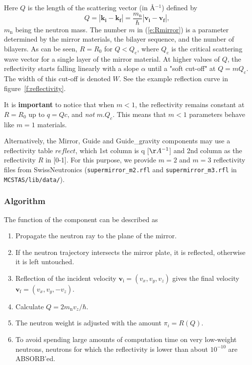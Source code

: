 Here $Q$ is the length of the scattering vector (in \AA$^{-1}$)
defined by
\begin{equation} \label{e:reflectivity}
Q = |\textbf{k}_\textbf{i} - \textbf{k}_\textbf{f}|
  = \frac{m_\textrm{n}}{\hbar} |\textbf{v}_\textbf{i} - \textbf{v}_\textbf{f}|,
\end{equation}
$m_\textrm{n}$ being the neutron mass.
The number $m$ in (\ref{e:Rmirror}) is a parameter determined by
the mirror materials,
the bilayer sequence, and the number of bilayers.
As can be seen, $R=R_0$ for $Q < Q_\textrm{c}$, where $Q_\textrm{c}$ is the
critical scattering wave vector for a single layer of the mirror
material. At higher values of $Q$, the reflectivity starts falling
linearly with a slope $\alpha$ until a "soft cut-off" at $Q = m Q_\textrm{c}$.
The width of this cut-off is denoted $W$. See the example reflection curve in
figure~\ref{f:reflectivity}.

It is \textbf{important} to notice that when $m < 1$, the reflectivity remains constant at $R=R_0$ up to $q=Qc$, and \emph{not} $m.Q_c$. This means that $m < 1$ parameters behave like $m=1$ materials.

Alternatively, the Mirror, Guide and Guide\_gravity components may use a reflectivity table $reflect$, which 1st column is q [$\AA^{-1}$] and 2nd column as the reflectivity $R$ in [0-1]. For this purpose, we provide $m=2$ and $m=3$ reflectivity files from SwissNeutronics (\verb+supermirror_m2.rfl+ and \verb+supermirror_m3.rfl+ in \verb+MCSTAS/lib/data/+).

\subsubsection{Algorithm}
The function of the component can be described as
\begin{enumerate}
\item Propagate the neutron ray to the plane of the mirror.
\item If the neutron trajectory intersects the mirror plate, it is
reflected, otherwise it is left untouched.
\item Reflection of the incident velocity
$\textbf{v}_\textrm{i} = (v_x,v_y,v_z)$
gives the final velocity $\textbf{v}_\textrm{f} = (v_x,v_y,-v_z)$.
\item Calculate $Q=2 m_\textrm{n} v_z / \hbar$.
\item The neutron weight is adjusted with the amount $\pi_i = R(Q)$.
\item  To avoid spending large amounts of computation time on very low-weight
neutrons, neutrons for which the reflectivity is lower than about
$10^{-10}$ are ABSORB'ed.
\end{enumerate}

